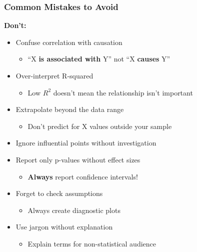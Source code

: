 \documentclass{beamer}
\begin{document}
\begin{frame}
\frametitle{Common Mistakes to Avoid}
\textbf{Don't:}
\begin{itemize}
\item Confuse correlation with causation
  \begin{itemize}
  \item ``X \textbf{is associated with} Y'' not ``X \textbf{causes} Y''
  \end{itemize}
\item Over-interpret R-squared
  \begin{itemize}
  \item Low $R^2$ doesn't mean the relationship isn't important
  \end{itemize}
\item Extrapolate beyond the data range
  \begin{itemize}
  \item Don't predict for X values outside your sample
  \end{itemize}
\item Ignore influential points without investigation
\item Report only p-values without effect sizes
  \begin{itemize}
  \item \textbf{Always} report confidence intervals!
  \end{itemize}
\item Forget to check assumptions
  \begin{itemize}
  \item Always create diagnostic plots
  \end{itemize}
\item Use jargon without explanation
  \begin{itemize}
  \item Explain terms for non-statistical audience
  \end{itemize}
\end{itemize}
\end{frame}
\end{document}

